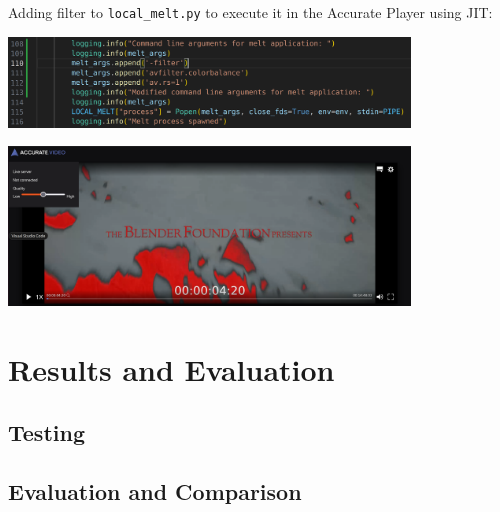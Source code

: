 \documentclass[12pt,a4paper]{article}
\begin{document}
Adding filter to \texttt{local\_melt.py} to execute it in the Accurate Player using JIT:

\begin{center}
	\includegraphics[width=0.8\textwidth]{code.png}
\end{center}

\begin{center}
	\includegraphics[width=0.8\textwidth]{ap_red.png}
\end{center}




%
%
%
%
%
%
%
%
\newpage
\section{Results and Evaluation} \label{section:results}


\subsection{Testing} \label{subsection:testing}


\subsection{Evaluation and Comparison} \label{subsection:evaluationandcomparison}
\end{document}

